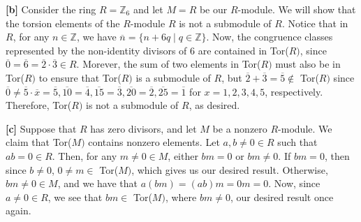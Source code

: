 \vspace{5 mm}
\textbf{[b]} Consider the ring $R = \mathbb{Z}_6$ and let $M = R$ be our $R$-module. We will show that the torsion elements of the $R$-module $R$ is not a submodule of $R$. Notice that in $R$, for any $n \in \mathbb{Z}$, we have $\overline{n} = \{n + 6q \mid q \in \mathbb{Z}\}$. Now, the congruence classes represented by the non-identity divisors of 6 are contained in Tor($R)$, since $\overline{0} = \overline{6} = \overline{2}\cdot\overline{3} \in R$. Morever, the sum of two elements in Tor($R)$ must also be in Tor($R)$ to ensure that Tor($R)$ is a submodule of $R$, but $\overline{2} + \overline{3} = \overline{5} \not\in$ Tor($R)$ since $\overline{0} \not= \overline{5}\cdot\overline{x} = \overline{5}, \overline{10} = \overline{4}, \overline{15} = \overline{3}, \overline{20} = \overline{2}, \overline{25} = \overline{1}$ for $x = 1,2,3,4,5$, respectively. Therefore, Tor($R)$ is not a submodule of $R$, as desired.

\vspace{5 mm}
\textbf{[c]} Suppose that $R$ has zero divisors, and let $M$ be a nonzero $R$-module. We claim that Tor($M)$ contains nonzero elements. Let $a,b \not= 0 \in R$ such that $ab = 0 \in R$. Then, for any $m \not= 0 \in M$, either $bm = 0$ or $bm \not=0$. If $bm = 0$, then since $b \not=0$, $0 \not=m \in$ Tor($M)$, which gives us our desired result. Otherwise, $bm \not=0 \in M$, and we have that $a(bm) = (ab)m = 0m = 0$. Now, since $a \not= 0 \in R$, we see that $bm \in$ Tor($M)$, where $bm \not=0$, our desired result once again.